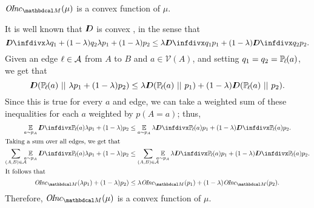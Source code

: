 \begin{subappendices}
\begin{lemma}
	\label{theorem:inc-convex}
	$\OInc_{\dg M}( \mu)$ is a convex function of $\mu$.
\end{lemma}
\begin{lproof}\label{proof:inc-convex}
    It is well known that $I\mkern-8muD$ is convex \cite[Theorem
            2.7.2]{CoverThomas}, in the sense that  
	\[ \kldiv{\lambda q_1 + (1-\lambda) q_2 }{ \lambda p_1
			  + (1-\lambda) p_2} \leq \lambda \kldiv {q_1}{ p_1} +
							(1-\lambda) \kldiv{q_2}{p_2}. \] 
Given an edge $\ell \in \mathcal A$ from $A$ to $B$ and $a \in \mathcal V(A)$,
and   
setting $q_1 = q_2 = \p_\ell(a)$, we get that
	\[ \thickD(\p_\ell(a) \ ||\ \lambda p_1 + (1-\lambda) p_2)
			\leq \lambda \thickD (\p_\ell(a) \ ||\ p_1) + (1-\lambda)
							\thickD(\p_\ell(a)\ ||\ p_2). \] 
	Since this is true for every $a$ and edge, we can take
		   a weighted sum of these inequalities for each $a$
		   weighted by $p(A=a)$; thus, 
	\begin{align*}
		\Ex_{a\sim p_A} \kldiv{\p_\ell(a)}{\lambda p_1 +
			(1-\lambda) p_2} &\leq 
			 \Ex_{a\sim p_A}\lambda \kldiv {\p_\ell(a)}{p_1} +
											(1-\lambda)
                         			 \kldiv{\p_\ell(a)}{p_2}. \\
                        \intertext{Taking a sum over all edges, we get
                        that}
					\sum_{(A, B) \in \Ar}\mskip-10mu\Ex_{a\sim p_A} \kldiv{\p_\ell(a) }{\lambda p_1 + (1-\lambda) p_2} 
			&\leq \sum_{(A, B) \in
							  \Ar}\mskip-10mu\Ex_{a\sim p_A}\lambda
							\kldiv{\p_\ell(a)}{p_1} + (1-\lambda)
							\kldiv{\p_\ell(a)}{p_2}. \\
    \shortintertext{It follows that} 
		\OInc_{\dg M}( \lambda p_1) + (1-\lambda)p_2)
					&\leq \lambda \OInc_{\dg M}(p_1) + (1-\lambda)
					\OInc_{\dg M}(p_2). 
	\end{align*}
	Therefore, $\OInc_{\dg M}( \mu)$ is a convex function of $\mu$.
\end{lproof}


\end{subappendices}
